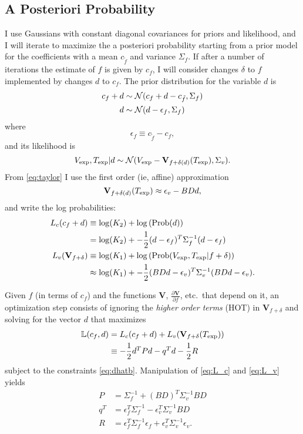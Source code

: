 \documentclass[11pt]{article}
\newcommand{\normal}[2]{{\cal N}(#1,#2)}
\newcommand{\normalexp}[3]{ -\frac{1}{2}
      (#1 - #2)^T #3^{-1} (#1 - #2) }
\newcommand{\fnom}{\tilde f}
\newcommand{\Prob}{\text{Prob}}
\newcommand{\partiald}[2]{\frac{\partial #1}{\partial #2}}
\newcommand\Vt{\mathbf{V}}
\newcommand\vexp{V_{\rm{exp}}}
\newcommand\texp{T_{\rm{exp}}}
\newcommand\cf{c_f}
\newcommand\DVDf{\partiald{\Vt}{f}}
\newcommand\Lbb{\mathbb{L}}
\newcommand\epv{\epsilon_v}
\newcommand\epf{\epsilon_f}
\begin{document}
\subsection{A Posteriori Probability}
\label{sec:app}

I use Gaussians with constant diagonal covariances for priors and
likelihood, and I will iterate to maximize the a posteriori
probability starting from a prior model for the coefficients with a
mean $c_{\fnom}$ and variance $\Sigma_f$.  If after a number of
iterations the estimate of $f$ is given by $c_f$, I will consider
changes $\delta$ to $f$ implemented by changes $d$ to $c_f$.  The
prior distribution for the variable $d$ is
\begin{align}
  \cf+d &\sim \normal{\cf+d - c_{\fnom}}{\Sigma_f} \nonumber \\
  \label{eq:priord}
  d &\sim \normal{d - \epf}{\Sigma_f}
\end{align}
where
\begin{equation}
  \label{eq:epf}
  \epf \equiv c_{\fnom} - c_f,
\end{equation}
and its likelihood is
\begin{equation}
  \label{eq:liked}
  \vexp,\texp | d \sim
  \normal{\vexp-\Vt_{f+\delta(d)}(\texp)}{\Sigma_v}.
\end{equation}
From \eqref{eq:taylor} I use the first order (ie, affine)
approximation
\begin{equation*}
  \Vt_{f+\delta(d)}(\texp) \approx \epv - BDd,
\end{equation*}
and write the log probabilities:
\begin{align}
  L_c(\cf+d) & \equiv \log(K_2) + \log \left(\Prob(d) \right)\nonumber\\
  \label{eq:L_c}
  & = \log(K_2) + \normalexp{d}{\epf}{\Sigma_f}\\
  L_v(\Vt_{f+\delta}) & \equiv \log(K_1) + \log
  \left(\Prob(\vexp,\texp | f+\delta) \right) \nonumber\\
  \label{eq:L_v}
  &\approx \log(K_1) + \normalexp{BDd}{\epv}{\Sigma_v}.
\end{align}

Given $f$ (in terms of $\cf$) and the functions $\Vt$, $\DVDf$, etc.\
that depend on it, an optimization step consists of ignoring the
\emph{higher order terms} (HOT) in $\Vt_{f+\delta}$ and solving for
the vector $d$ that maximizes
\begin{align*}
  \Lbb(\cf,d) &= L_c(\cf + d) + L_v(\Vt_{f+\delta}(\texp)) \\
  & \equiv -\frac{1}{2} d^T P d - q^T d -
    \frac{1}{2} R
\end{align*}
subject to the constraints \eqref{eq:dhatb}.  Manipulation of
\eqref{eq:L_c} and \eqref{eq:L_v} yields
\label{eq:PqR}
\begin{subequations}
  \begin{align}
    P &= \Sigma_f^{-1} + (BD)^T \Sigma_v^{-1} BD \\
    q^T &= \epf^T \Sigma_f^{-1} - \epv^T
          \Sigma_v^{-1} BD  \\
    \label{eq:R}
    R &= \epf^T \Sigma_f^{-1} \epf + \epv^T \Sigma_v^{-1} \epv.
  \end{align}
\end{subequations}
\end{document}
